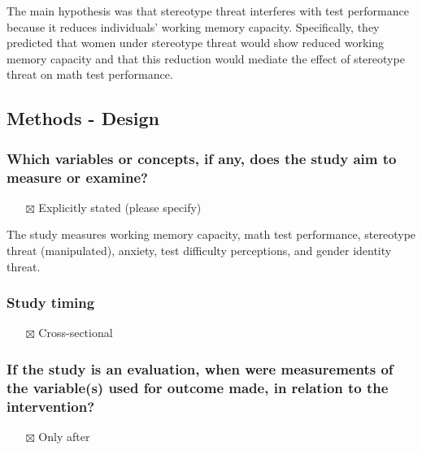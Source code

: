 \documentclass[
  doc, a4paper]{apa7}
\providecommand{\tightlist}{%
  \setlength{\itemsep}{0pt}\setlength{\parskip}{0pt}}
\begin{document}
The main hypothesis was that stereotype threat interferes with test performance because it reduces individuals' working memory capacity. Specifically, they predicted that women under stereotype threat would show reduced working memory capacity and that this reduction would mediate the effect of stereotype threat on math test performance.

\subsection{Methods - Design}\label{methods---design}

\subsubsection{Which variables or concepts, if any, does the study aim to measure or examine?}\label{which-variables-or-concepts-if-any-does-the-study-aim-to-measure-or-examine}

\begin{itemize}
\tightlist
\item[$\boxtimes$]
  Explicitly stated (please specify)
\end{itemize}

The study measures working memory capacity, math test performance, stereotype threat (manipulated), anxiety, test difficulty perceptions, and gender identity threat.

\subsubsection{Study timing}\label{study-timing}

\begin{itemize}
\tightlist
\item[$\boxtimes$]
  Cross-sectional
\end{itemize}

\subsubsection{If the study is an evaluation, when were measurements of the variable(s) used for outcome made, in relation to the intervention?}\label{if-the-study-is-an-evaluation-when-were-measurements-of-the-variables-used-for-outcome-made-in-relation-to-the-intervention}

\begin{itemize}
\tightlist
\item[$\boxtimes$]
  Only after
\end{itemize}
\end{document}
